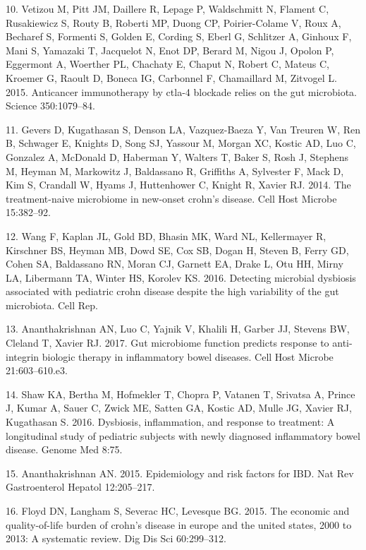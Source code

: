 \documentclass[12pt,]{article}
\begin{document}
\hypertarget{ref-Vetizou_cancer_2015}{}
10. Vetizou M, Pitt JM, Daillere R, Lepage P, Waldschmitt N, Flament C,
Rusakiewicz S, Routy B, Roberti MP, Duong CP, Poirier-Colame V, Roux A,
Becharef S, Formenti S, Golden E, Cording S, Eberl G, Schlitzer A,
Ginhoux F, Mani S, Yamazaki T, Jacquelot N, Enot DP, Berard M, Nigou J,
Opolon P, Eggermont A, Woerther PL, Chachaty E, Chaput N, Robert C,
Mateus C, Kroemer G, Raoult D, Boneca IG, Carbonnel F, Chamaillard M,
Zitvogel L. 2015. Anticancer immunotherapy by ctla-4 blockade relies on
the gut microbiota. Science 350:1079--84.

\hypertarget{ref-gevers_pedsCD_2014}{}
11. Gevers D, Kugathasan S, Denson LA, Vazquez-Baeza Y, Van Treuren W,
Ren B, Schwager E, Knights D, Song SJ, Yassour M, Morgan XC, Kostic AD,
Luo C, Gonzalez A, McDonald D, Haberman Y, Walters T, Baker S, Rosh J,
Stephens M, Heyman M, Markowitz J, Baldassano R, Griffiths A, Sylvester
F, Mack D, Kim S, Crandall W, Hyams J, Huttenhower C, Knight R, Xavier
RJ. 2014. The treatment-naive microbiome in new-onset crohn's disease.
Cell Host Microbe 15:382--92.

\hypertarget{ref-wang_pedsCD_2016}{}
12. Wang F, Kaplan JL, Gold BD, Bhasin MK, Ward NL, Kellermayer R,
Kirschner BS, Heyman MB, Dowd SE, Cox SB, Dogan H, Steven B, Ferry GD,
Cohen SA, Baldassano RN, Moran CJ, Garnett EA, Drake L, Otu HH, Mirny
LA, Libermann TA, Winter HS, Korolev KS. 2016. Detecting microbial
dysbiosis associated with pediatric crohn disease despite the high
variability of the gut microbiota. Cell Rep.

\hypertarget{ref-Ananthakrishnan_IBD_2017}{}
13. Ananthakrishnan AN, Luo C, Yajnik V, Khalili H, Garber JJ, Stevens
BW, Cleland T, Xavier RJ. 2017. Gut microbiome function predicts
response to anti-integrin biologic therapy in inflammatory bowel
diseases. Cell Host Microbe 21:603--610.e3.

\hypertarget{ref-Shaw_response_2016}{}
14. Shaw KA, Bertha M, Hofmekler T, Chopra P, Vatanen T, Srivatsa A,
Prince J, Kumar A, Sauer C, Zwick ME, Satten GA, Kostic AD, Mulle JG,
Xavier RJ, Kugathasan S. 2016. Dysbiosis, inflammation, and response to
treatment: A longitudinal study of pediatric subjects with newly
diagnosed inflammatory bowel disease. Genome Med 8:75.

\hypertarget{ref-ananthakrishnan_epidemiology_2015}{}
15. Ananthakrishnan AN. 2015. Epidemiology and risk factors for IBD. Nat
Rev Gastroenterol Hepatol 12:205--217.

\hypertarget{ref-floyd_economicburden_2015}{}
16. Floyd DN, Langham S, Severac HC, Levesque BG. 2015. The economic and
quality-of-life burden of crohn's disease in europe and the united
states, 2000 to 2013: A systematic review. Dig Dis Sci 60:299--312.
\end{document}
